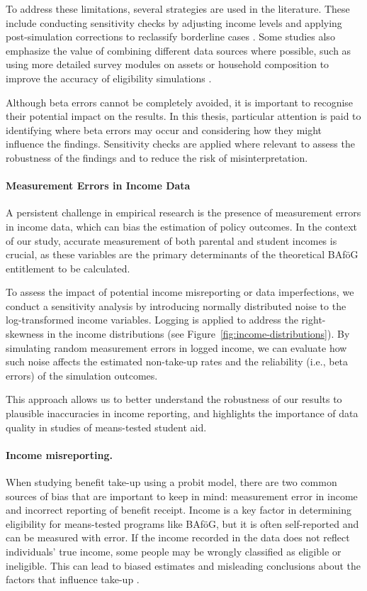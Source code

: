To address these limitations, several strategies are used in the literature. 
These include conducting sensitivity checks by adjusting income levels and applying post-simulation corrections to reclassify borderline cases \citep{herber_non-take-up_2019}. 
Some studies also emphasize the value of combining different data sources where possible, such as using more detailed survey modules on assets or household composition to improve the accuracy of eligibility simulations \citep{janssens_takemod_2022}. 

Although beta errors cannot be completely avoided, it is important to recognise their potential impact on the results. 
In this thesis, particular attention is paid to identifying where beta errors may occur and considering how they might influence the findings. 
Sensitivity checks are applied where relevant to assess the robustness of the findings and to reduce the risk of misinterpretation. %

\paragraph{Measurement Errors in Income Data}
A persistent challenge in empirical research is the presence of measurement errors in income data, which can bias the estimation of policy outcomes. 
In the context of our study, accurate measurement of both parental and student incomes is crucial, as these variables are the primary determinants of the theoretical BAföG entitlement to be calculated.

To assess the impact of potential income misreporting or data imperfections, we conduct a sensitivity analysis by introducing normally distributed noise to the log-transformed income variables. 
Logging is applied to address the right-skewness in the income distributions (see Figure~\ref{fig:income-distributions}). 
By simulating random measurement errors in logged income, we can evaluate how such noise affects the estimated non-take-up rates and the reliability (i.e., beta errors) of the simulation outcomes.

This approach allows us to better understand the robustness of our results to plausible inaccuracies in income reporting, and highlights the importance of data quality in studies of means-tested student aid.

\paragraph{Income misreporting.}
When studying benefit take-up using a probit model, there are two common sources of bias that are important to keep in mind: measurement error in income and incorrect reporting of benefit receipt. Income is a key factor in determining eligibility for means-tested programs like BAföG, but it is often self-reported and can be measured with error. If the income recorded in the data does not reflect individuals' true income, some people may be wrongly classified as eligible or ineligible. This can lead to biased estimates and misleading conclusions about the factors that influence take-up \citep{pudney_impact_2001}.

